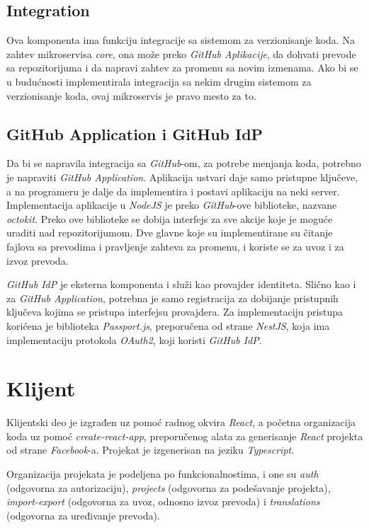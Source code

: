 \subsection{Integration}
Ova komponenta ima funkciju integracije sa sistemom za verzionisanje koda. 
Na zahtev mikroservisa \textit{core}, ona može preko \textit{GitHub Aplikacije}, 
da dohvati prevode sa repozitorijuma i da napravi zahtev za promenu sa 
novim izmenama. Ako bi se u budućnosti implementirala integracija sa nekim 
drugim sistemom za verzionisanje koda, ovaj mikroservis je pravo mesto za to.

\subsection{GitHub Application i GitHub IdP}
Da bi se napravila integracija sa \textit{GitHub}-om, za potrebe menjanja 
koda, potrebno je napraviti \textit{GitHub Application}. Aplikacija 
ustvari daje samo pristupne ključeve, a na programeru je dalje da implementira 
i postavi aplikaciju na neki server. Implementacija aplikacije u \textit{NodeJS} 
je preko \textit{GitHub}-ove biblioteke, nazvane \textit{octokit}. Preko ove 
biblioteke se dobija interfejs za sve akcije koje je moguće uraditi nad 
repozitorijumom. Dve glavne koje su implementirane su čitanje fajlova sa 
prevodima i pravljenje zahteva za promenu, i koriste se za uvoz i za 
izvoz prevoda.

\textit{GitHub IdP} je eksterna komponenta i služi kao provajder identiteta. 
Slično kao i za \textit{GitHub Application}, potrebna je samo registracija 
za dobijanje pristupnih ključeva kojima se pristupa interfejsu provajdera. 
Za implementaciju pristupa korićena je biblioteka \textit{Passport.js}, 
preporučena od strane \textit{NestJS}, koja ima implementaciju 
protokola \textit{OAuth2}, koji koristi \textit{GitHub IdP}.

\section{Klijent}
Klijentski deo je izgrađen uz pomoć radnog okvira \textit{React}, a početna 
organizacija koda uz pomoć \textit{create-react-app}, preporučenog alata za 
generisanje \textit{React} projekta od strane \textit{Facebook}-a. 
Projekat je izgenerisan na jeziku \textit{Typescript}. 

Organizacija projekata je podeljena po funkcionalnostima, i one su 
\textit{auth} (odgovorna za autorizaciju), \textit{projects} (odgovorna za 
podešavanje projekta), \textit{import-export} (odgovorna za 
uvoz, odnosno izvoz prevoda) i \textit{translations} (odgovorna za uređivanje 
prevoda).

